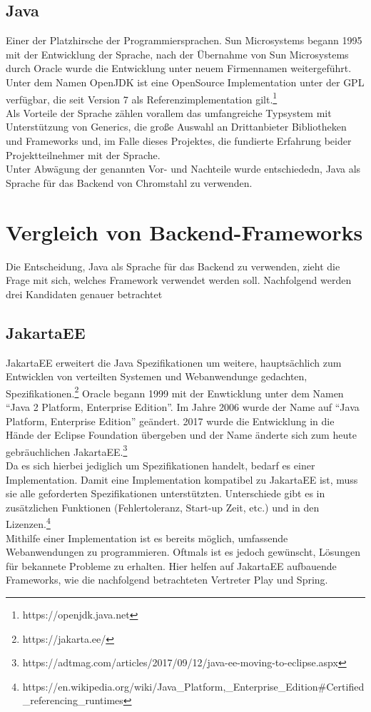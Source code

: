 \subsection{Java}
Einer der Platzhirsche der Programmiersprachen. Sun Microsystems begann 1995 mit
der Entwicklung der Sprache, nach der Übernahme von Sun Microsystems durch Oracle wurde die
Entwicklung unter neuem Firmennamen weitergeführt. Unter dem Namen OpenJDK ist
eine OpenSource Implementation unter der \ac{GPL} verfügbar, die seit Version 7 als
Referenzimplementation gilt.\footnote{https://openjdk.java.net}\\
Als Vorteile der Sprache zählen vorallem das umfangreiche Typsystem mit
Unterstützung von Generics, die große Auswahl an Drittanbieter Bibliotheken und Frameworks und,
im Falle dieses Projektes, die fundierte Erfahrung beider Projektteilnehmer mit
der Sprache.\\
Unter Abwägung der genannten Vor- und Nachteile wurde entschiededn, Java als
Sprache für das Backend von Chromstahl zu verwenden.
\section{Vergleich von Backend-Frameworks}
Die Entscheidung, Java als Sprache für das Backend zu verwenden, zieht die Frage
mit sich, welches Framework verwendet werden soll. Nachfolgend werden drei
Kandidaten genauer betrachtet
\subsection{\acl{JakartaEE}}
\ac{JakartaEE} erweitert die Java Spezifikationen um weitere, hauptsächlich zum
Entwicklen von verteilten Systemen und Webanwendunge gedachten, Spezifikationen.\footnote{https://jakarta.ee/}
Oracle begann 1999 mit der
Enwticklung unter dem Namen ``Java 2 Platform, Enterprise Edition''. Im Jahre
2006 wurde der Name auf ``Java Platform, Enterprise Edition'' geändert. 2017
wurde die Entwicklung in die Hände der Eclipse Foundation übergeben und der Name
änderte sich zum heute gebräuchlichen
\acs{JakartaEE}.\footnote{https://adtmag.com/articles/2017/09/12/java-ee-moving-to-eclipse.aspx}\\
Da es sich hierbei jediglich um Spezifikationen handelt, bedarf es einer
Implementation. Damit eine Implementation kompatibel zu \ac{JakartaEE} ist, muss
sie alle geforderten Spezifikationen unterstützten. Unterschiede gibt es in
zusätzlichen Funktionen (Fehlertoleranz, Start-up Zeit, etc.) und in den
Lizenzen.\footnote{https://en.wikipedia.org/wiki/Java\_Platform,\_Enterprise\_Edition\#Certified\_referencing\_runtimes}\\
Mithilfe einer Implementation ist es bereits möglich, umfassende Webanwendungen
zu programmieren. Oftmals ist es jedoch gewünscht, Lösungen für bekannete
Probleme zu erhalten. Hier helfen auf \ac{JakartaEE} aufbauende Frameworks, wie
die nachfolgend betrachteten Vertreter Play und Spring.
